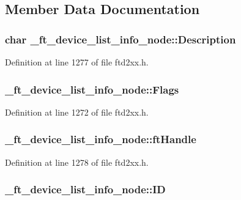 \subsection{Member Data Documentation}
\hypertarget{struct__ft__device__list__info__node_a2ed17bec72cbe5e73a2e83cd29a8e681}{
\subsubsection[{Description}]{\setlength{\rightskip}{0pt plus 5cm}char {\bf \_\-ft\_\-device\_\-list\_\-info\_\-node::Description}}}
\label{struct__ft__device__list__info__node_a2ed17bec72cbe5e73a2e83cd29a8e681}


Definition at line 1277 of file ftd2xx.h.\hypertarget{struct__ft__device__list__info__node_a721b47fa89702eff50b231f17c4298e6}{
\subsubsection[{Flags}]{ {\bf \_\-ft\_\-device\_\-list\_\-info\_\-node::Flags}}}
\label{struct__ft__device__list__info__node_a721b47fa89702eff50b231f17c4298e6}


Definition at line 1272 of file ftd2xx.h.\hypertarget{struct__ft__device__list__info__node_a3a26fc5e6180c4f87dec4ebf1951d100}{
\subsubsection[{ftHandle}]{ {\bf \_\-ft\_\-device\_\-list\_\-info\_\-node::ftHandle}}}
\label{struct__ft__device__list__info__node_a3a26fc5e6180c4f87dec4ebf1951d100}


Definition at line 1278 of file ftd2xx.h.\hypertarget{struct__ft__device__list__info__node_a6f486d775e8b49190ec48e99cdbdcbe5}{
\subsubsection[{ID}]{ {\bf \_\-ft\_\-device\_\-list\_\-info\_\-node::ID}}}
\label{struct__ft__device__list__info__node_a6f486d775e8b49190ec48e99cdbdcbe5}


